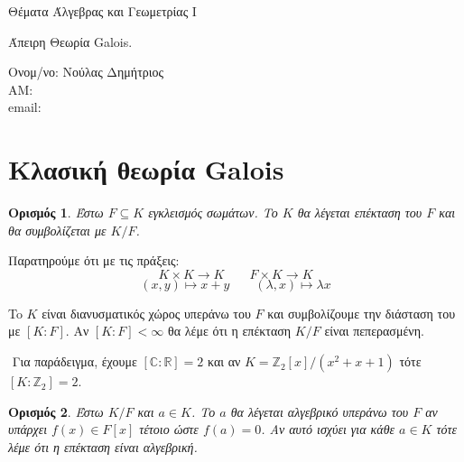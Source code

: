 \documentclass[oneside,a4paper]{article}
\newtheorem*{defn}{Ορισμός}
\newcommand {\tl}{\textlatin}
\newcommand{\Z}{\mathbb{Z}}
\begin{document}
	
	
	\begin{framed}	
		\begin{center}
			\huge Θέματα Άλγεβρας και Γεωμετρίας \tl{I}
		\end{center}
		\begin{center}
			\huge Άπειρη Θεωρία \tl{Galois}.
		\end{center}
		\vspace{0.3truecm}
		\begin{center}
			Ονομ/νο: Νούλας Δημήτριος\\
			ΑΜ: \\
			\tl{email}:
		\end{center}
		\vspace{0.3truecm}
	\end{framed}
\vspace{1cm}

\pagebreak
\section{Κλασική θεωρία \tl{Galois}}
\vspace{1cm}

\begin{defn}
	Έστω $F\subseteq K$ εγκλεισμός σωμάτων. Το $K$ θα λέγεται επέκταση του $F$ και θα συμβολίζεται με $K/F$.
\end{defn}

Παρατηρούμε ότι με τις πράξεις:
$$K\times K \longrightarrow K \quad\quad F \times K \longrightarrow K$$
$$(x,y) \longmapsto x+y \quad\quad (\lambda, x) \longmapsto \lambda x$$

To $K$ είναι διανυσματικός χώρος υπεράνω του $F$ και συμβολίζουμε την διάσταση του με $[K:F]$. Αν $[K:F]<\infty$ θα λέμε ότι η επέκταση $K/F$ είναι πεπερασμένη.

$ $\newline
Για παράδειγμα, έχουμε $[\mathbb C : \mathbb R] = 2$ και αν $K = \Z_2 [x]/(x^2 + x + 1)$ τότε $[K:\Z_2] = 2$.

\begin{defn}
	Έστω $K/F$ και $a \in K$. Το $a$ θα λέγεται αλγεβρικό υπεράνω του $F$ αν υπάρχει $f(x) \in F[x]$ τέτοιο ώστε $f(a)=0$. Αν αυτό ισχύει για κάθε $a \in K$ τότε λέμε ότι η επέκταση είναι αλγεβρική.
\end{defn}
\end{document}
